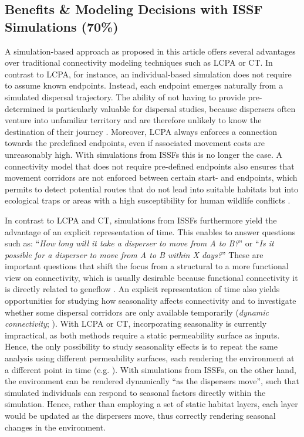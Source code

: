 \documentclass[abstract=on,10pt,a4paper,bibliography=totocnumbered]{article}
\begin{document}
\subsection{Benefits \& Modeling Decisions with ISSF Simulations (70\%)}
A simulation-based approach as proposed in this article offers several
advantages over traditional connectivity modeling techniques such as LCPA or CT.
In contrast to LCPA, for instance, an individual-based simulation does not
require to assume known endpoints. Instead, each endpoint emerges naturally from
a simulated dispersal trajectory. The ability of not having to provide
pre-determined is particularly valuable for dispersal studies, because
dispersers often venture into unfamiliar territory and are therefore unlikely to
know the destination of their journey \citep{Elliot.2014, Abrahms.2017,
Cozzi.2020}. Moreover, LCPA always enforces a connection towards the predefined
endpoints, even if associated movement costs are unreasonably high. With
simulations from ISSFs this is no longer the case. A connectivity model that
does not require pre-defined endpoints also ensures that movement corridors are
not enforced between certain start- and endpoints, which permits to detect
potential routes that do not lead into suitable habitats but into ecological
traps \citep{Dwernychuk.1972, VanDerMeer.2014} or areas with a high
susceptibility for human wildlife conflicts \citep{Cushman.2018}.

In contrast to LCPA and CT, simulations from ISSFs furthermore yield the
advantage of an explicit representation of time. This enables to answer
questions such as: ``\textit{How long will it take a disperser to move from A to
B?}'' or ``\textit{Is it possible for a disperser to move from A to B within X
days?}'' These are important questions that shift the focus from a structural to
a more functional view on connectivity, which is usually desirable because
functional connectivity it is directly related to geneflow \citep{Taylor.1993,
Tischendorf.2000}. An explicit representation of time also yields opportunities
for studying how seasonality affects connectivity and to investigate whether
some dispersal corridors are only available temporarily (\textit{dynamic
connectivity}; \citealp{Zeller.2020}). With LCPA or CT, incorporating
seasonality is currently impractical, as both methods require a static
permeability surface as inputs. Hence, the only possibility to study seasonality
effects is to repeat the same analysis using different permeability surfaces,
each rendering the environment at a different point in time (e.g.
\citealp{Benz.2016, Osipova.2019}). With simulations from ISSFs, on the other
hand, the environment can be rendered dynamically ``as the dispersers move'',
such that simulated individuals can respond to seasonal factors directly within
the simulation. Hence, rather than employing a set of static habitat layers,
each layer would be updated as the dispersers move, thus correctly rendering
seasonal changes in the environment.
\end{document}
